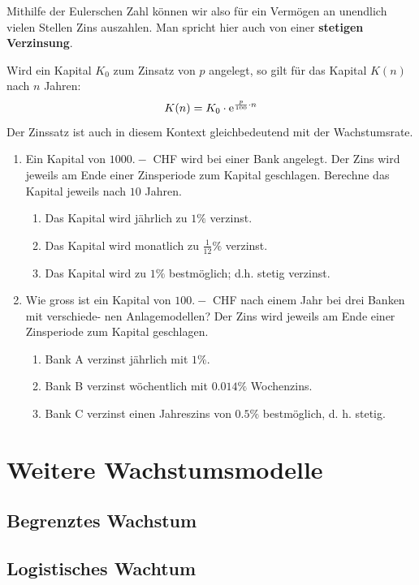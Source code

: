 \documentclass[11pt,oneside]{article}
\begin{document}
	Mithilfe der Eulerschen Zahl können wir also für ein Vermögen an unendlich vielen Stellen Zins auszahlen. Man spricht hier auch von einer \textbf{stetigen Verzinsung}.
	\begin{satz}
		Wird ein Kapital $K_0$ zum Zinsatz von $p$ angelegt, so gilt für das Kapital $K(n)$ nach $n$ Jahren:
		\[K(n)=K_0\cdot\operatorname{\operatorname{e}}^{\frac{p}{100}\cdot n}\]
		Der Zinssatz ist auch in diesem Kontext gleichbedeutend mit der Wachstumsrate.
	\end{satz}
	\begin{aufgabe}
		\begin{enumerate}
			\item Ein Kapital von $1000.-$ CHF wird bei einer Bank angelegt. Der Zins wird jeweils am Ende einer Zinsperiode zum Kapital geschlagen. Berechne das Kapital jeweils nach $10$ Jahren.
			\begin{enumerate}[label=\alph*)]
				\item Das Kapital wird jährlich zu $1\%$ verzinst.
				\item Das Kapital wird monatlich zu $\frac{1}{12}\%$ verzinst.
				\item Das Kapital wird zu $1\%$ bestmöglich; d.h. stetig verzinst.
			\end{enumerate}
			\item Wie gross ist ein Kapital von $100.-$ CHF nach einem Jahr bei drei Banken mit verschiede-
			nen Anlagemodellen? Der Zins wird jeweils am Ende einer Zinsperiode zum Kapital geschlagen.
			\begin{enumerate}[label=\alph*)]
				\item Bank A verzinst jährlich mit $1\%$.
				\item Bank B verzinst wöchentlich mit $0.014\%$ Wochenzins.
				\item Bank C verzinst einen Jahreszins von $0.5\%$ bestmöglich, d. h. stetig.
			\end{enumerate}
		\end{enumerate}
	\end{aufgabe}


\newpage
\section{Weitere Wachstumsmodelle}
\subsection{Begrenztes Wachstum}
\subsection{Logistisches Wachtum}
\end{document}
